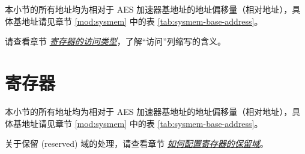 \documentclass[main\_\_CN.tex]{subfiles}
\begin{document}
本小节的所有地址均为相对于 AES 加速器基地址的地址偏移量（相对地址），具体基地址请见章节 \ref{mod:sysmem} \textit{} 中的表 \ref{tab:sysmem-base-address}。

请查看章节 \hyperref[glossary-access-types]{\textit{寄存器的访问类型}}，了解“访问”列缩写的含义。




\newpage
\section{寄存器}

本小节的所有地址均为相对于 AES 加速器基地址的地址偏移量（相对地址），具体基地址请见章节 \ref{mod:sysmem} \textit{} 中的表 \ref{tab:sysmem-base-address}。

关于保留 (reserved) 域的处理，请查看章节 \hyperref[programming-reserved-field]{\textit{如何配置寄存器的保留域}}。


\end{document}
